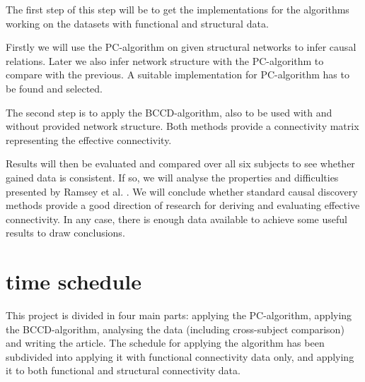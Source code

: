 \documentclass[a4paper, 10pt, english, twocolumn]{article}
\begin{document}
The first step of this step will be to get the implementations for the algorithms working on the datasets with functional and structural data.

Firstly we will use the PC-algorithm on given structural networks to infer causal relations.
Later we also infer network structure with the PC-algorithm to compare with the previous.
A suitable implementation for PC-algorithm has to be found and selected.

The second step is to apply the BCCD-algorithm, also to be used with and without provided network structure.
Both methods provide a connectivity matrix representing the effective connectivity.

Results will then be evaluated and compared over all six subjects to see whether gained data is consistent.
If so, we will analyse the properties and difficulties presented by Ramsey et al. \cite{ramsey2010}.
We will conclude whether standard causal discovery methods provide a good direction of research for deriving and evaluating effective connectivity.
In any case, there is enough data available to achieve some useful results to draw conclusions.



\section{time schedule}
This project is divided in four main parts: applying the PC-algorithm, applying the BCCD-algorithm, analysing the data (including cross-subject comparison) and writing the article. The schedule for applying the algorithm has been subdivided into applying it with functional connectivity data only, and applying it to both functional and structural connectivity data.



{}

\end{document}
